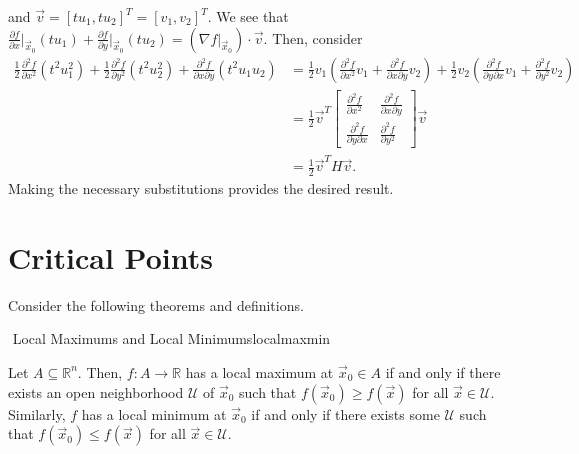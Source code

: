     and \(\vec{v}=[tu_1,tu_2]^T=[v_1,v_2]^T\). We see that \(\frac{\partial f}{\partial x}\Big|_{\vec{x}_0}(tu_1)+\frac{\partial f}{\partial y}\Big|_{\vec{x}_0}(tu_2)=\left(\nabla f\Big|_{\vec{x}_0}\right)\cdot\vec{v}\). Then, consider
    \begin{align*}
        \frac{1}{2}\frac{\partial^2 f}{\partial x^2}(t^2u_1^2)+\frac{1}{2}\frac{\partial^2 f}{\partial y^2}(t^2u_2^2)+\frac{\partial^2f}{\partial x\partial y}(t^2u_1u_2)&=\frac{1}{2}v_1\left(\frac{\partial^2f}{\partial x^2}v_1+\frac{\partial^2f}{\partial x\partial y}v_2\right)+\frac{1}{2}v_2\left(\frac{\partial^2f}{\partial y\partial x}v_1+\frac{\partial^2f}{\partial y^2}v_2\right) \\
        &=\frac{1}{2}\vec{v}^T\begin{bmatrix} \frac{\partial^2f}{\partial x^2} & \frac{\partial^2f}{\partial x\partial y} \\ \frac{\partial^2f}{\partial y\partial x} & \frac{\partial^2f}{\partial y^2} \end{bmatrix}\vec{v} \\
        &=\frac{1}{2}\vec{v}^TH\vec{v}.
    \end{align*}
    Making the necessary substitutions provides the desired result.

\pagebreak

\section{Critical Points}

    Consider the following theorems and definitions.
    \begin{definition}{\Stop\,\,Local Maximums and Local Minimums}{localmaxmin}

        Let \(A\subseteq\mathbb{R}^n\). Then, \(f:A\to\mathbb{R}\) has a local maximum at \(\vec{x}_0\in A\) if and only if there exists an open neighborhood \(\mathcal{U}\) of \(\vec{x}_0\) such that \(f(\vec{x}_0)\geq f(\vec{x})\) for all \(\vec{x}\in\mathcal{U}\). Similarly, \(f\) has a local minimum at \(\vec{x}_0\) if and only if there exists some \(\mathcal{U}\) such that \(f(\vec{x}_0)\leq f(\vec{x})\) for all \(\vec{x}\in\mathcal{U}\).
        
    \end{definition}